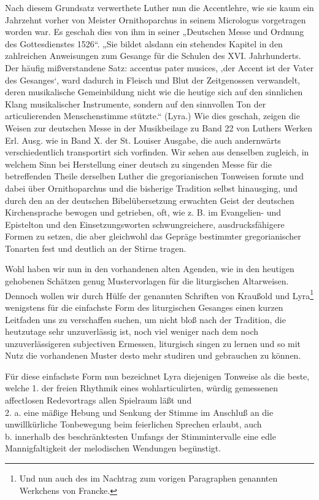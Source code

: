 Nach diesem Grundsatz verwerthete Luther nun die Accentlehre, wie sie kaum ein Jahrzehnt vorher von Meister Ornithoparchus in seinem Micrologus vorgetragen worden war. Es geschah dies von ihm in seiner „Deutschen Messe und Ordnung des Gottesdienstes 1526“. „Sie bildet alsdann ein stehendes Kapitel in den zahlreichen Anweisungen zum Gesange für die Schulen des XVI. Jahrhunderts. Der häufig mißverstandene Satz: accentus pater musices, ‚der Accent ist der Vater des Gesanges‘, ward dadurch in Fleisch und Blut der Zeitgenossen verwandelt, deren musikalische Gemeinbildung nicht wie die heutige sich auf den sinnlichen Klang musikalischer Instrumente, sondern auf den sinnvollen Ton der articulierenden Menschenstimme stützte.“ (Lyra.) Wie dies geschah, zeigen die Weisen zur deutschen Messe in der Musikbeilage zu Band 22 von Luthers Werken Erl. Ausg. wie in Band X. der St. Louiser Ausgabe, die auch andernwärts verschiedentlich transportirt sich vorfinden. Wir sehen aus denselben zugleich, in welchem Sinn bei Herstellung einer deutsch zu singenden Messe für die betreffenden Theile derselben Luther die gregorianischen Tonweisen formte und dabei über Ornithoparchus und die bisherige Tradition selbst hinausging, und durch den an der deutschen Bibelübersetzung erwachten Geist der deutschen Kirchensprache bewogen und getrieben, oft, wie z. B. im Evangelien- und Epistelton und den Einsetzungsworten schwungreichere, ausdrucksfähigere Formen zu setzen, die aber gleichwohl das Gepräge bestimmter gregorianischer Tonarten fest und deutlich an der Stirne tragen.

Wohl haben wir nun in den vorhandenen alten Agenden, wie in den heutigen gehobenen Schätzen genug Mustervorlagen für die liturgischen Altarweisen. Dennoch wollen wir durch Hülfe der genannten Schriften von Kraußold und Lyra\footnote{Und nun auch des im Nachtrag zum vorigen Paragraphen genannten Werkchens von Francke.} wenigstens für die einfachste Form des liturgischen Gesanges einen kurzen Leitfaden uns zu verschaffen suchen, um nicht bloß nach der Tradition, die heutzutage sehr unzuverlässig ist, noch viel weniger nach dem noch unzuverlässigeren subjectiven Ermessen, liturgisch singen zu lernen und so mit Nutz die vorhandenen Muster desto mehr studiren und gebrauchen zu können.

Für diese einfachste Form nun bezeichnet Lyra diejenigen Tonweise als die beste, welche
1. der freien Rhythmik eines wohlarticulirten, würdig gemessenen affectlosen Redevortrags allen Spielraum läßt und\\
2. a. eine mäßige Hebung und Senkung der Stimme im Anschluß an die unwillkürliche Tonbewegung beim feierlichen Sprechen erlaubt, auch\\
b. innerhalb des beschränktesten Umfangs der Stimmintervalle eine edle Mannigfaltigkeit der melodischen Wendungen begünstigt.

